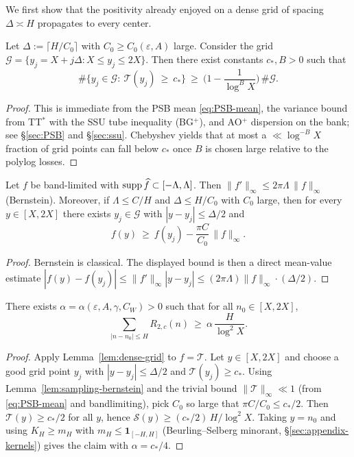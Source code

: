 We first show that the positivity already enjoyed on a dense grid of spacing $\Delta\asymp H$ propagates to every center.

\begin{lemma}
\label{lem:dense-grid}
Let $\Delta:=\lceil H/C_0\rceil$ with $C_0\ge C_0(\varepsilon,A)$ large. Consider the grid $\mathcal G=\{y_j = X + j\Delta : X\le y_j\le 2X\}$. Then there exist constants $c_*,B>0$ such that
\begin{equation}\label{eq:dense-grid}
\#\Big\{y_j\in\mathcal G:\ \mathcal T(y_j)\ \ge\ c_* \Big\}
\ \ge\ \Big(1-\frac1{\log^B X}\Big)\,\#\mathcal G.
\end{equation}
\end{lemma}

\begin{proof}
This is immediate from the PSB mean \eqref{eq:PSB-mean}, the variance bound from TT$^*$ with the SSU tube inequality (BG$^+$), and AO$^+$ dispersion on the bank; see \S\ref{sec:PSB} and \S\ref{sec:ssu}. Chebyshev yields that at most a $\ll \log^{-B}X$ fraction of grid points can fall below $c_*$ once $B$ is chosen large relative to the polylog losses.
\end{proof}

\begin{lemma}

Let $f$ be band-limited with $\operatorname{supp} \widehat f\subset[-\Lambda,\Lambda]$. Then $\|f'\|_\infty\le 2\pi \Lambda\,\|f\|_\infty$ (Bernstein). Moreover, if $\Lambda\le C/H$ and $\Delta\le H/C_0$ with $C_0$ large, then for every $y\in[X,2X]$ there exists $y_j\in\mathcal G$ with $|y-y_j|\le \Delta/2$ and
\[
f(y)\ \ge\ f(y_j) - \frac{\pi C}{C_0}\,\|f\|_\infty.
\]
\end{lemma}

\begin{proof}
Bernstein is classical. The displayed bound is then a direct mean-value estimate $|f(y)-f(y_j)|\le \|f'\|_\infty |y-y_j| \le (2\pi\Lambda)\|f\|_\infty\cdot (\Delta/2)$.
\end{proof}

\begin{theorem}
\label{thm:uniform-window-mean}
There exists $\alpha=\alpha(\varepsilon,A,\gamma,C_W)>0$ such that for all $n_0\in[X,2X]$,
\[
\sum_{|n-n_0|\le H} R_{2,c}(n)\ \ge\ \alpha\,\frac{H}{\log^2 X}.
\]
\end{theorem}

\begin{proof}
Apply Lemma~\ref{lem:dense-grid} to $f=\mathcal T$. Let $y\in[X,2X]$ and choose a good grid point $y_j$ with $|y-y_j|\le \Delta/2$ and $\mathcal T(y_j)\ge c_*$. Using Lemma~\ref{lem:sampling-bernstein} and the trivial bound $\|\mathcal T\|_\infty \ll 1$ (from \eqref{eq:PSB-mean} and bandlimiting), pick $C_0$ so large that $\pi C/C_0\le c_*/2$. Then $\mathcal T(y)\ge c_*/2$ for all $y$, hence $\mathcal S(y)\ge (c_*/2)\,H/\log^2 X$. Taking $y=n_0$ and using $K_H\ge m_H$ with $m_H\le \mathbf 1_{[-H,H]}$ (Beurling–Selberg minorant, \S\ref{sec:appendix-kernels}) gives the claim with $\alpha=c_*/4$.
\end{proof}

